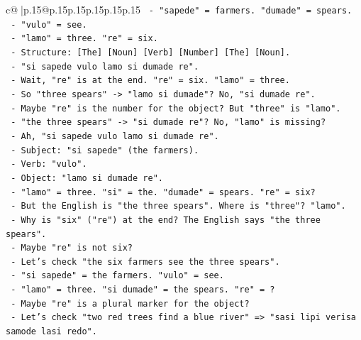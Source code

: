 \documentclass{article}
\begin{document}
{\begin{supertabular}{c@{$\;$}|p{.15\linewidth}@{}p{.15\linewidth}p{.15\linewidth}p{.15\linewidth}p{.15\linewidth}p{.15\linewidth}}
{{{\texttt{                  {-} "sapede" = farmers. "dumade" = spears.} \\
\texttt{                  {-} "vulo" = see.} \\
\texttt{                  {-} "lamo" = three. "re" = six.} \\
\texttt{                  {-} Structure: {[}The{]} {[}Noun{]} {[}Verb{]} {[}Number{]} {[}The{]} {[}Noun{]}.} \\
\texttt{                  {-} "si sapede vulo lamo si dumade re".} \\
\texttt{                  {-} Wait, "re" is at the end. "re" = six. "lamo" = three.} \\
\texttt{                  {-} So "three spears" {-}> "lamo si dumade"? No, "si dumade re".} \\
\texttt{                  {-} Maybe "re" is the number for the object? But "three" is "lamo".} \\
\texttt{                  {-} "the three spears" {-}> "si dumade re"? No, "lamo" is missing?} \\
\texttt{                  {-} Ah, "si sapede vulo lamo si dumade re".} \\
\texttt{                    {-} Subject: "si sapede" (the farmers).} \\
\texttt{                    {-} Verb: "vulo".} \\
\texttt{                    {-} Object: "lamo si dumade re".} \\
\texttt{                    {-} "lamo" = three. "si" = the. "dumade" = spears. "re" = six?} \\
\texttt{                    {-} But the English is "the three spears". Where is "three"? "lamo".} \\
\texttt{                    {-} Why is "six" ("re") at the end? The English says "the three spears".} \\
\texttt{                    {-} Maybe "re" is not six?} \\
\texttt{                    {-} Let's check "the six farmers see the three spears".} \\
\texttt{                    {-} "si sapede" = the farmers. "vulo" = see.} \\
\texttt{                    {-} "lamo" = three. "si dumade" = the spears. "re" = ?} \\
\texttt{                    {-} Maybe "re" is a plural marker for the object?} \\
\texttt{                    {-} Let's check "two red trees find a blue river" => "sasi lipi verisa samode lasi redo".} \\
}}}
\end{supertabular}}
\end{document}
